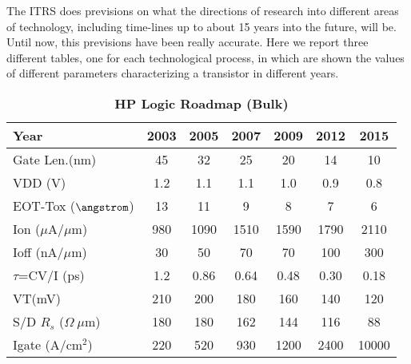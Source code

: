 \documentclass[a4paper, 12pt, twoside, openright]{report}
\begin{document}
The ITRS does previsions on what the directions of research into different areas of technology, including time-lines up to about 15 years into the future, will be. Until now, this previsions have been really accurate.
Here we report three different tables, one for each technological process, in which are shown the values of different parameters characterizing a transistor in different years.\\



 
   \begin{table}[h]
   \centering
     \begin{tabular}{||l||c|c|c|c|c|c||}\hline
      Year          & 2003 & 2005 & 2007 & 2009 & 2012 & 2015\\
      \hline
             
      Gate Len.(nm)  &45 &32 &25  &20  &14  &10\\ %
      \hline
      VDD (V)  &1.2  &1.1 &1.1 &1.0 &0.9 &0.8\\
      \hline
      EOT-Tox ($\angstrom$) &13 &11 &9 &8 &7 &6\\
      \hline
      {Ion} ($\mu$A/$\mu$m)  &980  &1090 &1510 &1590 &1790 &2110\\
      \hline
      {Ioff} (nA/$\mu$m)  &30 &50 &70 &70  &100  &300\\
      \hline
      {$\tau$=CV/I} (ps)  &1.2 &0.86 &0.64 &0.48 &0.30 &0.18\\
      \hline
      VT(mV)   &210  &200 &180 &160 &140 &120\\
      \hline
      S/D $R_s$ ($\Omega~\mu$m)   &180 &180 &162 &144 &116 &88\\
      \hline
      Igate (A/cm$^2$)   &220 &520 &930 &1200 &2400 &10000\\
      \hline
     \end{tabular}
     \caption{\textbf{HP Logic Roadmap (Bulk)}}
   \end{table}
\end{document}
